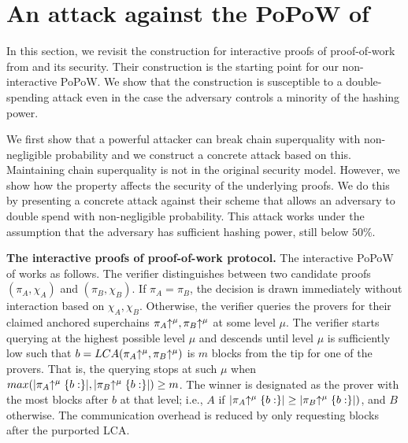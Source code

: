 \section{An attack against the PoPoW of \cite{KLS}}

In this section, we revisit the construction for interactive proofs of
proof-of-work from \cite{KLS} and its security.  Their construction is the
starting point for our non-interactive PoPoW. We show that the
construction is susceptible to  a double-spending attack even in the case the
adversary controls a minority of the hashing power.

We first show that a powerful attacker can break chain superquality with
non-negligible probability and we construct a concrete attack based on this.
Maintaining chain superquality is not in the original security model. However,
we show how the property affects the security of the underlying proofs. We do
this by presenting a concrete attack against their scheme that allows an
adversary to double spend with non-negligible probability. This attack works
under the assumption that the adversary has sufficient hashing power, still
below $50\%$.

\noindent
\textbf{The interactive proofs of proof-of-work protocol.}
The interactive PoPoW of \cite{KLS} works as follows. The verifier distinguishes
between two candidate proofs $(\pi_A, \chi_A)$ and $(\pi_B, \chi_B)$. If $\pi_A =
\pi_B$, the decision is drawn immediately without interaction based on
$\chi_A,\chi_B$. Otherwise, the verifier queries the provers for their claimed
anchored superchains $\pi_A\negthickspace\uparrow^\mu, \pi_B\negthickspace\uparrow^\mu$ at some level $\mu$.
The verifier starts querying at the highest possible level $\mu$ and descends
until level $\mu$ is sufficiently low such that $b = LCA(\pi_A\negthickspace\uparrow^\mu,
\pi_B\negthickspace\uparrow^\mu)$ is $m$ blocks from the tip for one of the provers. That is,
the querying stops at such $\mu$ when $max(|\pi_A\negthickspace\uparrow^\mu\{b:\}|,
|\pi_B\negthickspace\uparrow^\mu\{b:\}|) \geq m$. The winner is designated as the prover with
the most blocks after $b$ at that level; i.e., $A$ if $|\pi_A\negthickspace\uparrow^\mu\{b:\}|
\geq |\pi_B\negthickspace\uparrow^\mu\{b:\}|)$, and $B$ otherwise. The communication overhead
is reduced by only requesting blocks after the purported LCA.

